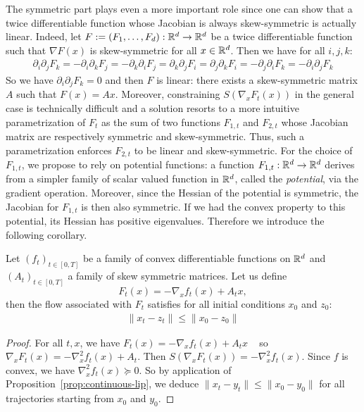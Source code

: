The symmetric part plays even a more important role since one can show that a twice differentiable function whose Jacobian is always skew-symmetric is actually linear. Indeed, let $F:=(F_1,\dots,F_d):\mathbb{R}^d\to\mathbb{R}^d$ be a twice differentiable function such that $\nabla F(x)$ is skew-symmetric for all $x\in\mathbb{R}^d$. Then we have for all $i,j,k$:
\begin{align*}
    \partial_i\partial_j F_k =  -\partial_i\partial_k F_j =-\partial_k\partial_i F_j = \partial_k\partial_j F_i = \partial_j\partial_k F_i = -\partial_j\partial_i F_k = -\partial_i\partial_j F_k
\end{align*}
So we have $\partial_i\partial_j F_k =0$ and then $F$ is linear: there exists a skew-symmetric matrix $A$ such that $F(x)=Ax$.
Moreover, constraining $S(\nabla_x F_{t}(x))$ in the general case is technically difficult and a solution resorts to a more intuitive parametrization of  $F_t$ as the sum of two functions $F_{1,t}$ and $F_{2,t}$ whose Jacobian matrix are respectively symmetric  and skew-symmetric.  Thus, such a parametrization enforces $F_{2,t}$  to be linear and skew-symmetric. For the choice of $F_{1,t}$, we propose to rely on potential functions: a function  $F_{1,t}:\mathbb{R}^d \to \mathbb{R}^d$ derives from a simpler family of scalar valued function in $\mathbb{R}^d$, called the \emph{potential}, via the gradient operation. Moreover, since the Hessian of the potential is symmetric, the Jacobian for $F_{1,t}$ is then also symmetric.  If we had the convex property to this potential, its Hessian has positive eigenvalues. Therefore we introduce the following corollary. 

\begin{corollary} 
\label{cor:conv-skew}Let $(f_{t})_{t\in[0,T]}$ be a family of convex differentiable functions on $\mathbb{R}^d$ and $(A_t)_{t\in[0,T]}$ a family of skew symmetric matrices. Let us define 
$$F_t(x) = -\nabla_x f_{t}(x)+A_t x,$$ 
then the flow associated with $F_t$ satisfies for all initial conditions $x_0$ and $z_0$:
\begin{align*}
\lVert x_t-z_t \rVert\leq \lVert x_0-z_0 \rVert
\end{align*}
\end{corollary}
\begin{proof}

  For all $t,x$, we have $F_t(x) = -\nabla_x f_{t}(x)+A_t x$ ~ so~
  $\nabla_x F_t(x) = -\nabla_x^2 f_{t}(x)+A_t$. Then $S(\nabla_x F_t(x)) =-\nabla_x^2 f_{t}(x)$. Since $f$ is convex, we have $\nabla_x^2 f_{t}(x)\succeq 0$. So by application of Proposition~\ref{prop:continuous-lip}, we deduce $\lVert x_t-y_t \rVert\leq \lVert x_0-y_0 \rVert$ for all trajectories starting from $x_0$ and $y_0$.
\end{proof}


